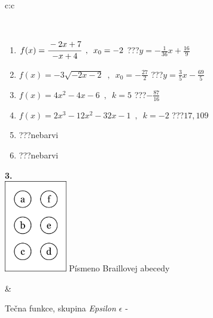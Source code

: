 \documentclass[10pt]{report}
\begin{document}
\begin{tabular}{c:c}
\begin{minipage}[c][104.5mm][t]{0.5\linewidth}
\begin{center}
\begin{minipage}{0.95\linewidth}
\begin{center}
\end{center}
\end{minipage}
\\[1mm]
\begin{minipage}{0.79\linewidth}
\begin{center}
\begin{varwidth}{\linewidth}
\begin{enumerate}
\small
\item $f(x)=\cfrac{-2x+7}{-x+4}\enspace , \enspace x_0=-2$\quad \dotfill\; ???\;\dotfill \quad $y = -\frac{1}{36}x+\frac{16}{9}$
\item $f(x)=-3\sqrt{-2x-2}\enspace , \enspace x_0=-\frac{27}{2}$\quad \dotfill\; ???\;\dotfill \quad $y = \frac{3}{5}x-\frac{69}{5}$
\item $f(x)=4x^2-4x-6\enspace , \enspace k=5$\quad \dotfill\; ???\;\dotfill \quad $-\frac{87}{16}$
\item $f(x)=2x^3-12x^2-32x-1\enspace , \enspace k=-2$\quad \dotfill\; ???\;\dotfill \quad $17 , 109$
\item \quad \dotfill\; ???\;\dotfill \quad nebarvi
\item \quad \dotfill\; ???\;\dotfill \quad nebarvi
\end{enumerate}
\end{varwidth}
\end{center}
\end{minipage}
\begin{minipage}{0.20\linewidth}
\begin{center}
{\Huge\bfseries 3.} \\[2mm]
\includegraphics[height=40mm]{../images/braille.png}
{\small Písmeno Braillovej abecedy}
\end{center}
\end{minipage}
\end{center}
\end{minipage}
&
\begin{minipage}[c][104.5mm][t]{0.5\linewidth}
\begin{center}
\vspace{7mm}
{\huge Tečna funkce, skupina \textit{Epsilon $\epsilon$} -}\\[5mm]

\end{center}
\end{minipage}
\end{tabular}
\end{document}
